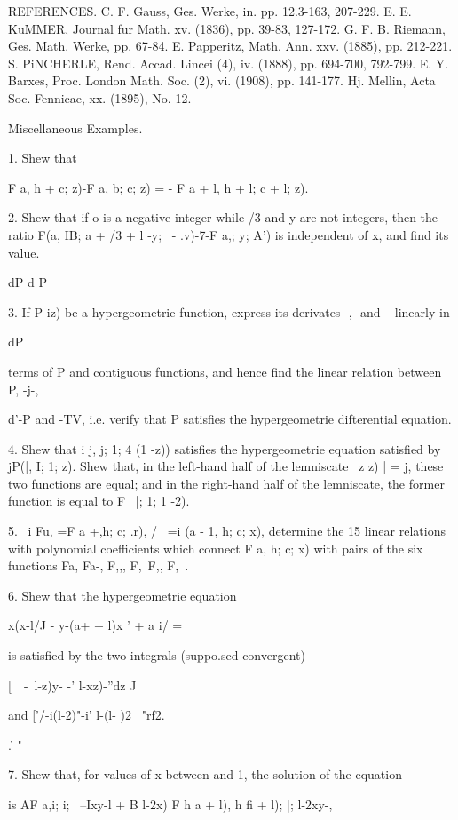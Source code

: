 REFERENCES. C. F. Gauss, Ges. Werke, in. pp. 12.3-163, 207-229. E. E.
KuMMER, Journal fur Math. xv. (1836), pp. 39-83, 127-172. G. F. B.
Riemann, Ges. Math. Werke, pp. 67-84. E. Papperitz, Math. Ann. xxv.
(1885), pp. 212-221. S. PiNCHERLE, Rend. Accad. Lincei (4), iv.
(1888), pp. 694-700, 792-799. E. Y. Barxes, Proc. London Math. Soc.
(2), vi. (1908), pp. 141-177. Hj. Mellin, Acta Soc. Fennicae, xx.
(1895), No. 12.

Miscellaneous Examples.

1. Shew that

F a, h + \; c; z)-F a, b; c; z) = - F a + l, h + l; c + l; z).

2. Shew that if o is a negative integer while /3 and y are not
integers, then the ratio F(a, IB; a + /3 + l -y; \ - .v)-7-F a,; y;
A') is independent of x, and find its value.

%
%

dP d P

3. If P iz) be a hypergeometrie function, express its derivates -,-
and -- linearly in

dP

terms of P and contiguous functions, and hence find the linear
relation between P, -j-,

d'-P and -TV, i.e. verify that P satisfies the hypergeometrie
difterential equation.

4. Shew that i j, j; 1; 4 (1 -z)) satisfies the hypergeometrie
equation satisfied by jP(|, I; 1; z). Shew that, in the left-hand
half of the lemniscate \ z z) | = j, these two functions are equal;
and in the right-hand half of the lemniscate, the former function is
equal to F \, |; 1; 1 -2).

5. \ i Fu, =F a +,h; c; .r), / \ =i (a - 1, h; c; x), determine the
15 linear relations with polynomial coefficients which connect F a, h;
c; x) with pairs of the six functions Fa, Fa-, F,,, F,\, F,, F,\ .

6. Shew that the hypergeometrie equation

x(x-l/J - y-(a+ + l)x ' + a i/ =

is satisfied by the two integrals (suppo.sed convergent)

[\ \ -\ l-z)y- -' l-xz)-''dz J

and ['/-i(l-2)"-i' l-(l- )2 ~"rf2.

.' "

7. Shew that, for values of x between and 1, the solution of the
equation

is AF a,i; i; \ --Ixy-l + B l-2x) F h a + l), h fi + l); |; l-2xy-,

